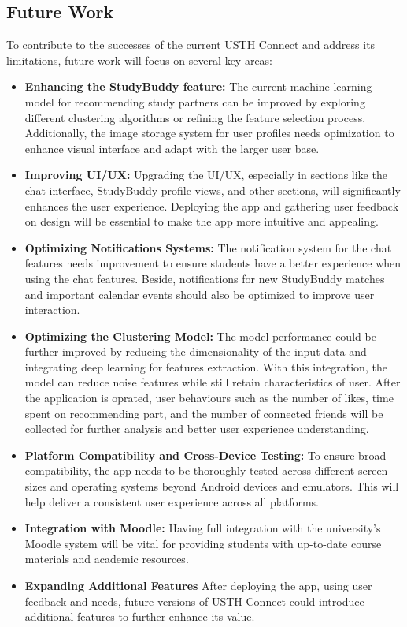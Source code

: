 \documentclass{article}
\begin{document}
\subsection{Future Work}
To contribute to the successes of the current USTH Connect and address its limitations, future work will focus on several key areas:
\begin{itemize}
    \item \textbf{Enhancing the StudyBuddy feature: } The current machine learning model for recommending study partners can be improved by exploring different clustering algorithms or refining the feature selection process. Additionally, the image storage system for user profiles needs opimization to enhance visual interface and adapt with the larger user base.
    \item \textbf{Improving UI/UX: } Upgrading the UI/UX, especially in sections like the chat interface, StudyBuddy profile views, and other sections, will significantly enhances the user experience. Deploying the app and gathering user feedback on design will be essential to make the app more intuitive and appealing.
    \item \textbf{Optimizing Notifications Systems: } The notification system for the chat features needs improvement to ensure students have a better experience when using the chat features. Beside, notifications for new StudyBuddy matches and important calendar events should also be optimized to improve user interaction.
    \item \textbf{Optimizing the Clustering Model: } The model performance could be further improved by reducing the dimensionality of the input data and integrating deep learning for features extraction. With this integration, the model can reduce noise features while still retain characteristics of user. After the application is oprated, user behaviours such as the number of likes, time spent on recommending part, and the number of connected friends will be collected for further analysis and better user experience understanding. 
    \item \textbf{Platform Compatibility and Cross-Device Testing: } To ensure broad compatibility, the app needs to be thoroughly tested across different screen sizes and operating systems beyond Android devices and emulators. This will help deliver a consistent user experience across all platforms.
    \item \textbf{Integration with Moodle: } Having full integration with the university's Moodle system will be vital for providing students with up-to-date course materials and academic resources.
    \item \textbf{Expanding Additional Features} After deploying the app, using user feedback and needs, future versions of USTH Connect could introduce additional features to further enhance its value.
\end{itemize}
\end{document}
